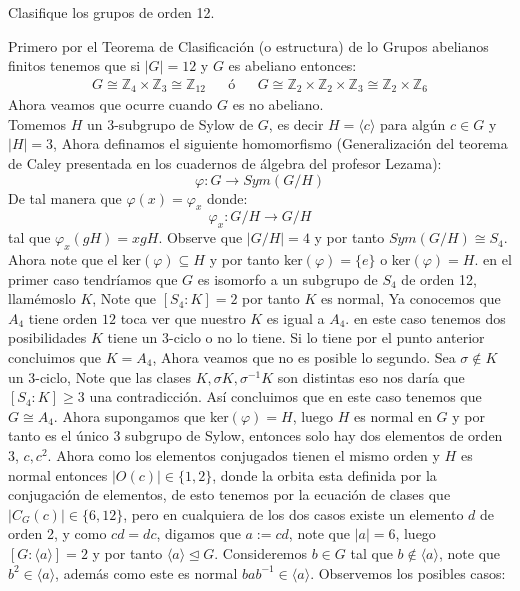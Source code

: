 \begin{homeworkProblem}
    Clasifique los grupos de orden 12.
    \begin{solucion}
    Primero por el Teorema de Clasificación (o estructura) de lo Grupos abelianos finitos tenemos que si $|G|=12$ y $G$ es abeliano entonces:
    \begin{align*}
G\cong\mathbb{Z}_4\times\mathbb{Z}_3\cong\mathbb{Z}_{12}&&\text{ó}&&G\cong\mathbb{Z}_2\times\mathbb{Z}_2\times\mathbb{Z}_3\cong\mathbb{Z}_2\times\mathbb{Z}_6
    \end{align*}
    Ahora veamos que ocurre cuando $G$ es no abeliano.\\

    Tomemos $H$ un 3-subgrupo de Sylow de $G$, es decir $H=\langle c\rangle$ para algún $c\in G$ y $|H|=3$, Ahora definamos el siguiente homomorfismo (Generalización del teorema de Caley presentada en los cuadernos de álgebra del profesor Lezama):
    $$\varphi:G\longrightarrow Sym(G/H)$$
    De tal manera que $\varphi(x)=\varphi_x$ donde:
    $$\varphi_x:G/H\longrightarrow G/H$$
    tal que $\varphi_x(gH)=xgH$. Observe que $|G/H|=4$ y por tanto $Sym(G/H)\cong S_4$. Ahora note que el ker$(\varphi)\subseteq H$ y por tanto ker$(\varphi)=\{e\}$ o ker$(\varphi)=H$. en el primer caso tendríamos que $G$ es isomorfo a un subgrupo de $S_4$ de orden 12, llamémoslo $K$, Note que $[S_4:K]=2$ por tanto $K$ es normal, Ya conocemos que $A_4$ tiene orden $12$ toca ver que nuestro $K$ es igual a $A_4$. en este caso tenemos dos posibilidades $K$ tiene un 3-ciclo o no lo tiene. Si lo tiene por el punto anterior concluimos que $K=A_4$, Ahora veamos que no es posible lo segundo. Sea $\sigma\notin K$ un 3-ciclo, Note que las clases $K,\sigma K, \sigma^{-1}K$ son distintas eso nos daría que $[S_4:K]\geq 3$ una contradicción. Así concluimos que en este caso tenemos que $G\cong A_4$. Ahora supongamos que ker$(\varphi)=H$, luego $H$ es normal en $G$ y por tanto es el único 3 subgrupo de Sylow, entonces solo hay dos elementos de orden 3, $c,c^2$. Ahora como los elementos conjugados tienen el mismo orden y $H$ es normal entonces $|O(c)|\in\{1,2\}$, donde la orbita esta definida por la conjugación de elementos, de esto tenemos por la ecuación de clases que $|C_G(c)|\in\{6,12\}$, pero en cualquiera de los dos casos existe un elemento $d$ de orden 2, y como $cd=dc$, digamos que $a:=cd$, note que $|a|=6$, luego $[G:\langle a\rangle]=2$ y por tanto $\langle a\rangle\trianglelefteq G$. Consideremos $b\in G$ tal que $b\notin\langle a\rangle$, note que $b^2\in\langle a\rangle$, además como este es normal $bab^{-1}\in\langle a\rangle$. Observemos los posibles casos:

\end{solucion}
\end{homeworkProblem}

